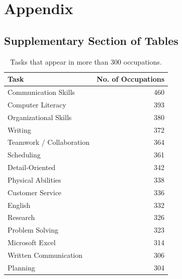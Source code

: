\documentclass[letterpaper]{article} %
\begin{document}

\appendix
\section{Appendix}

\vskip20pt
\subsection{Supplementary Section of Tables}

\begin{table}[h!]
\centering
\scriptsize
\begin{tabular}{l | r}
                        Task &  No. of Occupations \\
\hline
        Communication Skills &                 460 \\
           Computer Literacy &                 393 \\
       Organizational Skills &                 380 \\
                     Writing &                 372 \\
    Teamwork / Collaboration &                 364 \\
                  Scheduling &                 361 \\
             Detail-Oriented &                 342 \\
          Physical Abilities &                 338 \\
            Customer Service &                 336 \\
                     English &                 332 \\
                    Research &                 326 \\
             Problem Solving &                 323 \\
             Microsoft Excel &                 314 \\
       Written Communication &                 306 \\
                    Planning &                 304 \\
\hline
\end{tabular}
\caption{Tasks that appear in more than 300 occupations.
\label{table:task2soc}}
\end{table}
\end{document}
